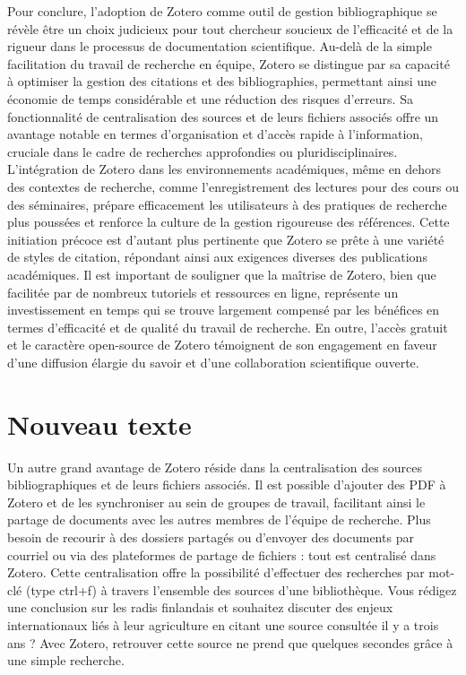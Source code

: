 \documentclass[
  letterpaper,
]{scrbook}
\begin{document}
Pour conclure, l'adoption de Zotero comme outil de gestion
bibliographique se révèle être un choix judicieux pour tout chercheur
soucieux de l'efficacité et de la rigueur dans le processus de
documentation scientifique. Au-delà de la simple facilitation du travail
de recherche en équipe, Zotero se distingue par sa capacité à optimiser
la gestion des citations et des bibliographies, permettant ainsi une
économie de temps considérable et une réduction des risques d'erreurs.
Sa fonctionnalité de centralisation des sources et de leurs fichiers
associés offre un avantage notable en termes d'organisation et d'accès
rapide à l'information, cruciale dans le cadre de recherches
approfondies ou pluridisciplinaires. L'intégration de Zotero dans les
environnements académiques, même en dehors des contextes de recherche,
comme l'enregistrement des lectures pour des cours ou des séminaires,
prépare efficacement les utilisateurs à des pratiques de recherche plus
poussées et renforce la culture de la gestion rigoureuse des références.
Cette initiation précoce est d'autant plus pertinente que Zotero se
prête à une variété de styles de citation, répondant ainsi aux exigences
diverses des publications académiques. Il est important de souligner que
la maîtrise de Zotero, bien que facilitée par de nombreux tutoriels et
ressources en ligne, représente un investissement en temps qui se trouve
largement compensé par les bénéfices en termes d'efficacité et de
qualité du travail de recherche. En outre, l'accès gratuit et le
caractère open-source de Zotero témoignent de son engagement en faveur
d'une diffusion élargie du savoir et d'une collaboration scientifique
ouverte.


\hypertarget{nouveau-texte}{%
\chapter{Nouveau texte}\label{nouveau-texte}}

Un autre grand avantage de Zotero réside dans la centralisation des
sources bibliographiques et de leurs fichiers associés. Il est possible
d'ajouter des PDF à Zotero et de les synchroniser au sein de groupes de
travail, facilitant ainsi le partage de documents avec les autres
membres de l'équipe de recherche. Plus besoin de recourir à des dossiers
partagés ou d'envoyer des documents par courriel ou via des plateformes
de partage de fichiers : tout est centralisé dans Zotero. Cette
centralisation offre la possibilité d'effectuer des recherches par
mot-clé (type ctrl+f) à travers l'ensemble des sources d'une
bibliothèque. Vous rédigez une conclusion sur les radis finlandais et
souhaitez discuter des enjeux internationaux liés à leur agriculture en
citant une source consultée il y a trois ans ? Avec Zotero, retrouver
cette source ne prend que quelques secondes grâce à une simple
recherche.
\end{document}
